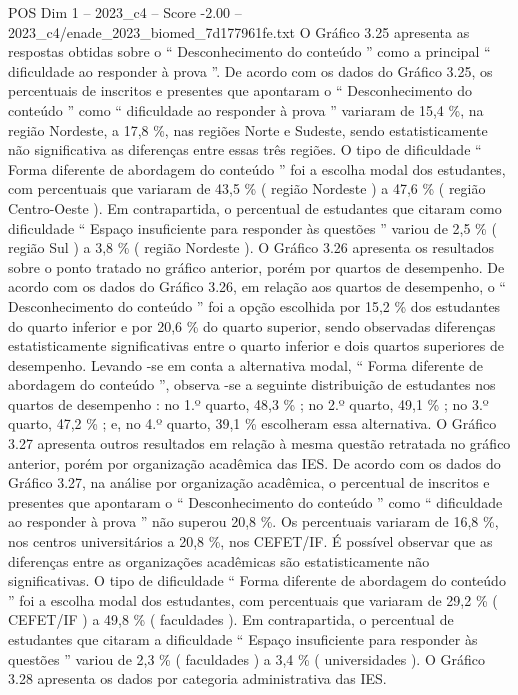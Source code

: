 \begin{textsample}{POS Dim 1 – 2023\_c4 – Score -2.00 – 2023\_c4/enade\_2023\_biomed\_7d177961fe.txt}
O Gráfico 3.25 apresenta as respostas obtidas sobre o “ Desconhecimento do conteúdo ” como a principal “ dificuldade ao responder à prova ”.
De acordo com os dados do Gráfico 3.25, os percentuais de inscritos e presentes que apontaram o “ Desconhecimento do conteúdo ” como “ dificuldade ao responder à prova ” variaram de 15,4 \%, na região Nordeste, a 17,8 \%, nas regiões Norte e Sudeste, sendo estatisticamente não significativa as diferenças entre essas três regiões.
O tipo de dificuldade “ Forma diferente de abordagem do conteúdo ” foi a escolha modal dos estudantes, com percentuais que variaram de 43,5 \% ( região Nordeste ) a 47,6 \% ( região Centro-Oeste ).
Em contrapartida, o percentual de estudantes que citaram como dificuldade “ Espaço insuficiente para responder às questões ” variou de 2,5 \% ( região Sul ) a 3,8 \% ( região Nordeste ).
O Gráfico 3.26 apresenta os resultados sobre o ponto tratado no gráfico anterior, porém por quartos de desempenho.
De acordo com os dados do Gráfico 3.26, em relação aos quartos de desempenho, o “ Desconhecimento do conteúdo ” foi a opção escolhida por 15,2 \% dos estudantes do quarto inferior e por 20,6 \% do quarto superior, sendo observadas diferenças estatisticamente significativas entre o quarto inferior e dois quartos superiores de desempenho.
Levando -se em conta a alternativa modal, “ Forma diferente de abordagem do conteúdo ”, observa -se a seguinte distribuição de estudantes nos quartos de desempenho : no 1.º quarto, 48,3 \% ; no 2.º quarto, 49,1 \% ; no 3.º quarto, 47,2 \% ; e, no 4.º quarto, 39,1 \% escolheram essa alternativa.
O Gráfico 3.27 apresenta outros resultados em relação à mesma questão retratada no gráfico anterior, porém por organização acadêmica das IES.
De acordo com os dados do Gráfico 3.27, na análise por organização acadêmica, o percentual de inscritos e presentes que apontaram o “ Desconhecimento do conteúdo ” como “ dificuldade ao responder à prova ” não superou 20,8 \%.
Os percentuais variaram de 16,8 \%, nos centros universitários a 20,8 \%, nos CEFET/IF.
É possível observar que as diferenças entre as organizações acadêmicas são estatisticamente não significativas.
O tipo de dificuldade “ Forma diferente de abordagem do conteúdo ” foi a escolha modal dos estudantes, com percentuais que variaram de 29,2 \% ( CEFET/IF ) a 49,8 \% ( faculdades ).
Em contrapartida, o percentual de estudantes que citaram a dificuldade “ Espaço insuficiente para responder às questões ” variou de 2,3 \% ( faculdades ) a 3,4 \% ( universidades ).
O Gráfico 3.28 apresenta os dados por categoria administrativa das IES.

\end{textsample}

